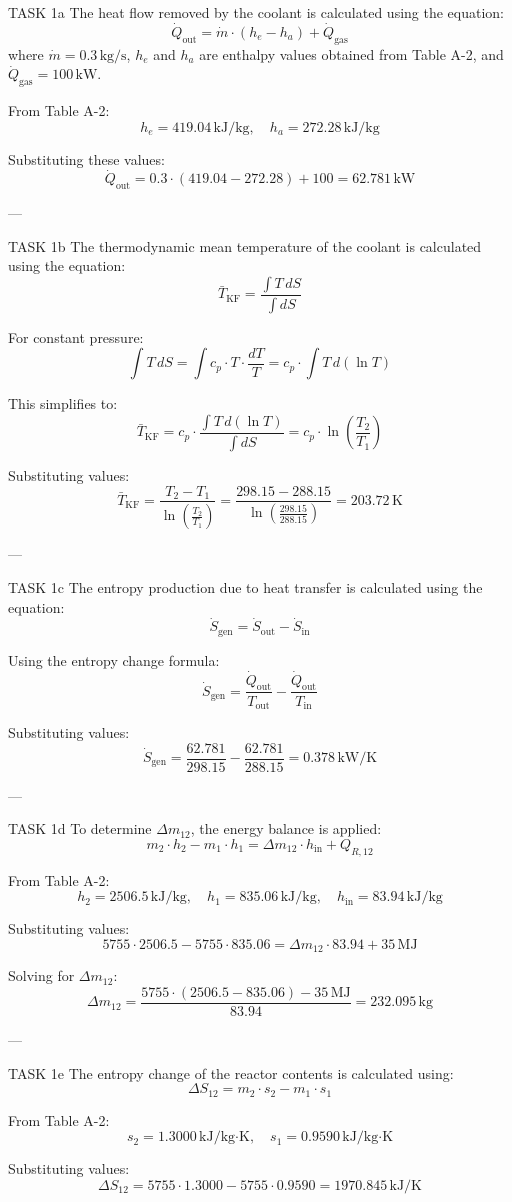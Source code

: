 TASK 1a  
The heat flow removed by the coolant is calculated using the equation:  
\[
\dot{Q}_{\text{out}} = \dot{m} \cdot (h_e - h_a) + \dot{Q}_{\text{gas}}
\]  
where \( \dot{m} = 0.3 \, \text{kg/s} \), \( h_e \) and \( h_a \) are enthalpy values obtained from Table A-2, and \( \dot{Q}_{\text{gas}} = 100 \, \text{kW} \).  

From Table A-2:  
\[
h_e = 419.04 \, \text{kJ/kg}, \quad h_a = 272.28 \, \text{kJ/kg}
\]  

Substituting these values:  
\[
\dot{Q}_{\text{out}} = 0.3 \cdot (419.04 - 272.28) + 100 = 62.781 \, \text{kW}
\]  

---

TASK 1b  
The thermodynamic mean temperature of the coolant is calculated using the equation:  
\[
\bar{T}_{\text{KF}} = \frac{\int T \, dS}{\int dS}
\]  

For constant pressure:  
\[
\int T \, dS = \int c_p \cdot T \cdot \frac{dT}{T} = c_p \cdot \int T \, d(\ln T)
\]  

This simplifies to:  
\[
\bar{T}_{\text{KF}} = c_p \cdot \frac{\int T \, d(\ln T)}{\int dS} = c_p \cdot \ln \left( \frac{T_2}{T_1} \right)
\]  

Substituting values:  
\[
\bar{T}_{\text{KF}} = \frac{T_2 - T_1}{\ln \left( \frac{T_2}{T_1} \right)} = \frac{298.15 - 288.15}{\ln \left( \frac{298.15}{288.15} \right)} = 203.72 \, \text{K}
\]  

---

TASK 1c  
The entropy production due to heat transfer is calculated using the equation:  
\[
\dot{S}_{\text{gen}} = \dot{S}_{\text{out}} - \dot{S}_{\text{in}}
\]  

Using the entropy change formula:  
\[
\dot{S}_{\text{gen}} = \frac{\dot{Q}_{\text{out}}}{T_{\text{out}}} - \frac{\dot{Q}_{\text{out}}}{T_{\text{in}}}
\]  

Substituting values:  
\[
\dot{S}_{\text{gen}} = \frac{62.781}{298.15} - \frac{62.781}{288.15} = 0.378 \, \text{kW/K}
\]  

---

TASK 1d  
To determine \( \Delta m_{12} \), the energy balance is applied:  
\[
m_2 \cdot h_2 - m_1 \cdot h_1 = \Delta m_{12} \cdot h_{\text{in}} + Q_{R,12}
\]  

From Table A-2:  
\[
h_2 = 2506.5 \, \text{kJ/kg}, \quad h_1 = 835.06 \, \text{kJ/kg}, \quad h_{\text{in}} = 83.94 \, \text{kJ/kg}
\]  

Substituting values:  
\[
5755 \cdot 2506.5 - 5755 \cdot 835.06 = \Delta m_{12} \cdot 83.94 + 35 \, \text{MJ}
\]  

Solving for \( \Delta m_{12} \):  
\[
\Delta m_{12} = \frac{5755 \cdot (2506.5 - 835.06) - 35 \, \text{MJ}}{83.94} = 232.095 \, \text{kg}
\]  

---

TASK 1e  
The entropy change of the reactor contents is calculated using:  
\[
\Delta S_{12} = m_2 \cdot s_2 - m_1 \cdot s_1
\]  

From Table A-2:  
\[
s_2 = 1.3000 \, \text{kJ/kg·K}, \quad s_1 = 0.9590 \, \text{kJ/kg·K}
\]  

Substituting values:  
\[
\Delta S_{12} = 5755 \cdot 1.3000 - 5755 \cdot 0.9590 = 1970.845 \, \text{kJ/K}
\]  